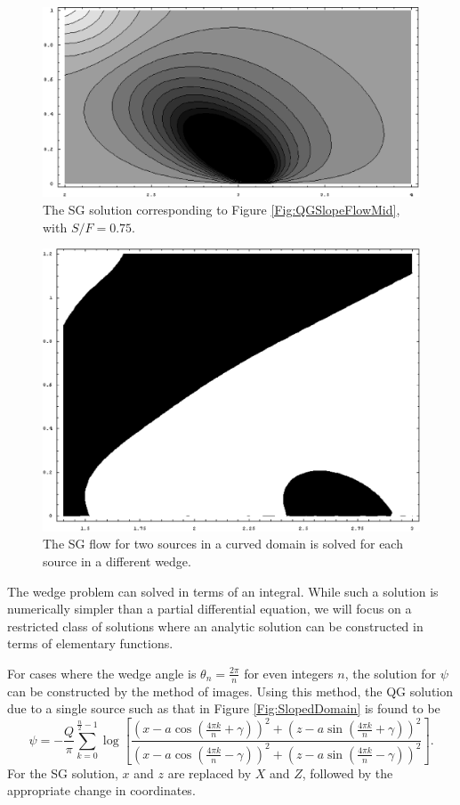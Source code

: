 \documentclass[11pt,onecolumn,oneside]{article}
\begin{document}
\begin{figure}[p]
\includegraphics[width=4.9in]{img/sg_slope_n16_s075_1src_btm.eps}
\caption{\small The SG solution corresponding to Figure \ref{Fig:QGSlopeFlowMid}, with $S/F = 0.75$.}
\label{Fig:SGSlopeFlowBtm}
\end{figure}

\begin{figure}[ht]
\includegraphics[width=4.9in]{img/sg_slope_2src_surface.eps}
\caption{\small The SG flow for two sources in a curved domain is solved for each source in a different wedge.}
\label{Fig:SGSlopedBoundary}
\end{figure}

The wedge problem can solved in terms of an integral. While such a solution is numerically simpler than a partial differential equation, we will focus on a restricted class of solutions where an analytic solution can be constructed in terms of elementary functions.

For cases where the wedge angle is $\theta_n = \frac{2 \pi}{n}$ for even integers $n$, the solution for $\psi$ can be constructed by the method of images. Using this method, the QG solution due to a single source such as that in Figure \ref{Fig:SlopedDomain} is found to be
\[
\psi = -\frac{Q}{\pi}\sum_{k=0}^{\frac{n}{2}-1} \log\left[\frac{\left(x-a\cos\left(\frac{4 \pi k}{n} + \gamma\right)\right)^2 + \left(z-a\sin\left(\frac{4 \pi k}{n} + \gamma\right)\right)^2}{\left(x-a\cos\left(\frac{4 \pi k}{n} - \gamma\right)\right)^2 + \left(z-a\sin\left(\frac{4 \pi k}{n} - \gamma\right)\right)^2} \right].
\]
For the SG solution, $x$ and $z$ are replaced by $X$ and $Z$, followed by the appropriate change in coordinates.
\end{document}
